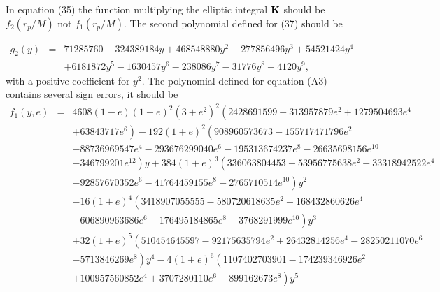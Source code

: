 \documentclass[aps,prd,amsfonts,amssymb,amsmath,nofootinbib,reprint,showpacs]{revtex4-1}
\begin{document}
In equation (35) the function multiplying the elliptic integral ${\bf{K}}$ should be $f_2(r_p/M)$ not $f_1(r_p/M)$.
The second polynomial defined for (37) should be
\begin{widetext}
\begin{eqnarray}
g_2(y) & = & 71285760-324389184 y+468548880 y^2-277856496 y^3+54521424 y^4 \nonumber \\
 & & + {} 6181872 y^5-1630457 y^6-238086 y^7-31776 y^8-4120 y^9,
\end{eqnarray}
with a positive coefficient for $y^2$. The polynomial defined for equation (A3) contains several sign errors, it should be
\begin{eqnarray}
f_1(y,e) & = & 4608 (1-e) (1+e)^2 \left(3+e^2\right)^2 \left(2428691599+313957879 e^2+1279504693 e^4 \right.\nonumber \\
 & & + \left. 63843717 e^6\right)-192 (1+e)^2 \left(908960573673-155717471796 e^2 \right.\nonumber \\
 & & - \left. 88736969547 e^4-293676299040 e^6-195313674237 e^8-26635698156 e^{10} \right. \nonumber \\
 & & - \left. 346799201 e^{12}\right) y+384 (1+e)^3 \left(336063804453-53956775638 e^2-33318942522 e^4 \right. \nonumber \\
 & & - \left. 92857670352 e^6-41764459155 e^8-2765710514 e^{10}\right) y^2 \nonumber \\
 & & - \left. 16 (1+e)^4 \left(3418907055555-580720618635 e^2-168432860626 e^4 \right.\right. \nonumber \\
 & & - \left. 606890963686 e^6-176495184865 e^8-3768291999 e^{10}\right) y^3 \nonumber \\
 & & + \left. 32 (1+e)^5 \left(510454645597-92175635794 e^2+26432814256 e^4-28250211070 e^6 \right.\right. \nonumber \\
 & & - \left. 5713846269 e^8\right) y^4-4 (1+e)^6 \left(1107402703901-174239346926 e^2 \right. \nonumber \\
 & & + \left. 100957560852 e^4+3707280110 e^6-899162673 e^8\right) y^5 \nonumber \\ 

\end{eqnarray}
\end{widetext}
\end{document}

